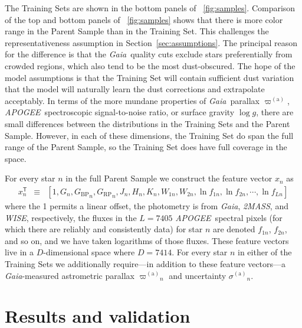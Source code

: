 \documentclass[modern]{aastex62}
\newcommand{\sectionname}{Section}
\newcommand{\acronym}[1]{{\small{#1}}}
\newcommand{\project}[1]{\textsl{#1}}
\newcommand{\apogee}{\project{\acronym{APOGEE}}}
\newcommand{\gaia}{\project{Gaia}}
\newcommand{\wise}{\project{\acronym{WISE}}}
\newcommand{\zmass}{\project{\acronym{2MASS}}}
\newcommand{\T}{^{\mathsf{T}}}
\newcommand{\logg}{\log g}
\newcommand{\BP}{{G_\mathrm{BP}}}
\newcommand{\RP}{{G_\mathrm{RP}}}
\newcommand{\gparallax}{{\varpi^{(\mathrm{a})}}}
\newcommand{\gsigma}{{\sigma^{(\mathrm{a})}}}
\begin{document}
The Training Sets are shown in the bottom panels of \figurename~\ref{fig:samples}.
Comparison of the top and bottom panels of {\figurename}~\ref{fig:samples} shows
that there is more color range in the Parent Sample than in the Training Set.
This challenges the representativeness assumption in \sectionname~\ref{sec:assumptions}.
The principal reason for the difference is that the \gaia\ quality cuts
exclude stars preferentially from crowded regions, which also tend to be the
most dust-obscured.
The hope of the model assumptions is that the Training Set will contain sufficient
dust variation that the model will naturally learn the dust corrections and extrapolate
acceptably.
In terms of the more mundane properties of \gaia\ parallax $\gparallax$,
\apogee\ spectroscopic signal-to-noise ratio,
or surface gravity $\logg$, there are small differences between the distributions
in the Training Sets and the Parent Sample.
However, in each of these dimensions, the Training Set do span the full range
of the Parent Sample, so the Training Set does have full coverage in the
space.

For every star $n$ in the full Parent Sample we construct the feature
vector $x_n$ as
\begin{eqnarray}
x_n\T &\equiv& [1, G_n, \BP_n, \RP_n, J_n, H_n, K_n, W_{1n}, W_{2n}, \ln f_{1n}, \ln f_{2n}, \cdots, \ln f_{Ln}]
\end{eqnarray}
where the 1 permits a linear offset,
the photometry is from \gaia, \zmass, and \wise, respectively,
the fluxes in the $L=7405$ \apogee\ spectral pixels (for which there are reliably
and consistently data) for star $n$ are denoted
$f_{1n}$, $f_{2n}$, and so on,
and we have taken logarithms of those fluxes.
These feature vectors live in a $D$-dimensional space where $D=7414$.
For every star $n$ in either of the Training Sets we additionally require---in
addition to these feature vectors---a \gaia-measured astrometric parallax $\gparallax_n$
and uncertainty $\gsigma_n$.

\section{Results and validation}\label{sec:results}
\end{document}

